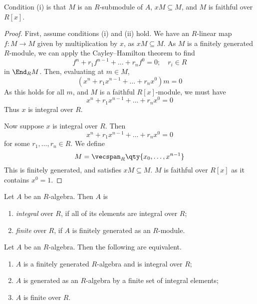 Condition (i) is that \( M \) is an \( R \)-submodule of \( A \), \( xM \subseteq M \), and \( M \) is faithful over \( R[x] \).
\begin{proof}
    First, assume conditions (i) and (ii) hold.
    We have an \( R \)-linear map \( f : M \to M \) given by multiplication by \( x \), as \( xM \subseteq M \).
    As \( M \) is a finitely generated \( R \)-module, we can apply the Cayley--Hamilton theorem to find
    \[ f^n + r_1 f^{n-1} + \dots + r_n f^0 =  0;\quad r_i \in R \]
    in \( \End_R M \).
    Then, evaluating at \( m \in M \),
    \[ (x^n + r_1 x^{n-1} + \dots + r_n x^0) m = 0 \]
    As this holds for all \( m \), and \( M \) is a faithful \( R[x] \)-module, we must have
    \[ x^n + r_1 x^{n-1} + \dots + r_n x^0 = 0 \]
    Thus \( x \) is integral over \( R \).

    Now suppose \( x \) is integral over \( R \).
    Then
    \[ x^n + r_1 x^{n-1} + \dots + r_n x^0 = 0 \]
    for some \( r_1, \dots, r_n \in R \).
    We define
    \[ M = \vecspan_R \qty{x_0, \dots, x^{n-1}} \]
    This is finitely generated, and satisfies \( xM \subseteq M \).
    \( M \) is faithful over \( R[x] \) as it contains \( x^0 = 1 \).
\end{proof}
\begin{definition}
    Let \( A \) be an \( R \)-algebra.
    Then \( A \) is
    \begin{enumerate}
        \item \emph{integral} over \( R \), if all of its elements are integral over \( R \);
        \item \emph{finite} over \( R \), if \( A \) is finitely generated as an \( R \)-module.
    \end{enumerate}
\end{definition}
\begin{proposition}
    Let \( A \) be an \( R \)-algebra.
    Then the following are equivalent.
    \begin{enumerate}
        \item \( A \) is a finitely generated \( R \)-algebra and is integral over \( R \);
        \item \( A \) is generated as an \( R \)-algebra by a finite set of integral elements;
        \item \( A \) is finite over \( R \).
    \end{enumerate}
\end{proposition}
